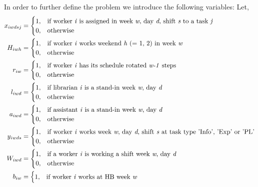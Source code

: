 In order to further define the problem we introduce the following variables: Let,
\begin{align}
    x_{iwdsj}&=
    \begin{cases}
      1, & \text{if worker \textit{i} is assigned in week \textit{w}, day \textit{d}, shift \textit{s} to a task \textit{j}}\\
      0, & \text{otherwise}
    \end{cases}
    \\
    H_{iwh}&=
    \begin{cases}
      1, & \text{if worker \textit{i} works weekend \textit{h} (= 1, 2) in week \textit{w}}\\
      0, & \text{otherwise}
    \end{cases}
	\\
	r_{iw}&=
	\begin{cases}
		1, & \text{if worker \textit{i} has its schedule rotated \textit{w-1} steps}\\
		0, & \text{otherwise}
	\end{cases}
	\\
	l_{iwd}&=
	\begin{cases}
	  1, & \text{if librarian \textit{i} is a stand-in week \textit{w}, day \textit{d}} \\
	  0, & \text{otherwise}
	\end{cases}
	\\
	a_{iwd}&=
	\begin{cases}
 		1, & \text{if assistant \textit{i} is a stand-in week \textit{w}, day \textit{d}} \\
 		0, & \text{otherwise}
	\end{cases}
	\\
	y_{iwds}&=
	\begin{cases}
 		1, & \text{if worker \textit{i} works week \textit{w}, day \textit{d}, shift \textit{s} at task type 'Info', 'Exp' or 'PL'} \\
 		0, & \text{otherwise}
	\end{cases}
	\\
	W_{iwd}&=
	\begin{cases}
	 	1, & \text{if a worker \textit{i} is working a shift week \textit{w}, day \textit{d}} \\
	 	0, & \text{otherwise}
	\end{cases}
	\\
	b_{iw}&=
	\begin{cases}
 		1, & \text{if worker \textit{i} works at HB week \textit{w}} \\

\end{cases}
\end{align}
